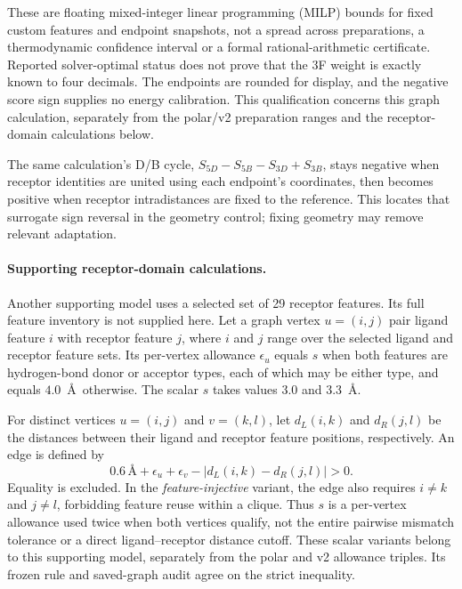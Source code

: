 \documentclass{article}
\begin{document}
These are floating mixed-integer linear programming (MILP) bounds for fixed custom features and endpoint snapshots, not a spread across preparations, a thermodynamic confidence interval or a formal rational-arithmetic certificate. Reported solver-optimal status does not prove that the 3F weight is exactly known to four decimals. The endpoints are rounded for display, and the negative score sign supplies no energy calibration. This qualification concerns this graph calculation, separately from the polar/v2 preparation ranges and the receptor-domain calculations below.

The same calculation's D/B cycle, \(S_{5D}-S_{5B}-S_{3D}+S_{3B}\), stays negative when receptor identities are united using each endpoint's coordinates, then becomes positive when receptor intradistances are fixed to the reference. This locates that surrogate sign reversal in the geometry control; fixing geometry may remove relevant adaptation.

\paragraph{Supporting receptor-domain calculations.}
Another supporting model uses a selected set of 29 receptor features. Its full feature inventory is not supplied here. Let a graph vertex \(u=(i,j)\) pair ligand feature \(i\) with receptor feature \(j\), where \(i\) and \(j\) range over the selected ligand and receptor feature sets. Its per-vertex allowance \(\epsilon_u\) equals \(s\) when both features are hydrogen-bond donor or acceptor types, each of which may be either type, and equals \(4.0\)~\AA\ otherwise. The scalar \(s\) takes values \(3.0\) and \(3.3\)~\AA.

For distinct vertices \(u=(i,j)\) and \(v=(k,l)\), let \(d_L(i,k)\) and \(d_R(j,l)\) be the distances between their ligand and receptor feature positions, respectively. An edge is defined by
\[
 0.6\,\text{\AA}+\epsilon_u+\epsilon_v
       -|d_L(i,k)-d_R(j,l)|>0.
\]
Equality is excluded. In the \emph{feature-injective} variant, the edge also requires \(i\ne k\) and \(j\ne l\), forbidding feature reuse within a clique. Thus \(s\) is a per-vertex allowance used twice when both vertices qualify, not the entire pairwise mismatch tolerance or a direct ligand--receptor distance cutoff. These scalar variants belong to this supporting model, separately from the polar and v2 allowance triples. Its frozen rule and saved-graph audit agree on the strict inequality.
\end{document}
